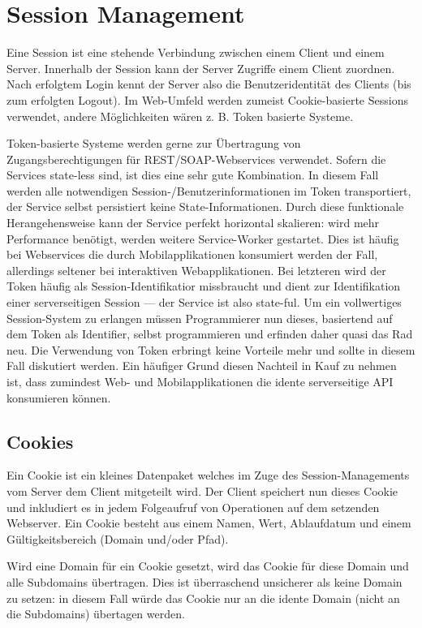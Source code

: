\chapter{Session Management}

Eine Session ist eine stehende Verbindung zwischen einem Client und einem Server. Innerhalb der Session kann der Server Zugriffe einem Client zuordnen. Nach erfolgtem Login kennt der Server also die Benutzeridentität des Clients (bis zum erfolgten Logout). Im Web-Umfeld werden zumeist Cookie-basierte Sessions verwendet, andere Möglichkeiten wären z. B. Token basierte Systeme.

Token-basierte Systeme werden gerne zur Übertragung von Zugangsberechtigungen für REST/SOAP-Webservices verwendet. Sofern die Services state-less sind, ist dies eine sehr gute Kombination. In diesem Fall werden alle notwendigen Session-/Benutzerinformationen im Token transportiert, der Service selbst persistiert keine State-Informationen. Durch diese funktionale Herangehensweise kann der Service perfekt horizontal skalieren: wird mehr Performance benötigt, werden weitere Service-Worker gestartet. Dies ist häufig bei Webservices die durch Mobilapplikationen konsumiert werden der Fall, allerdings seltener bei interaktiven Webapplikationen. Bei letzteren wird der Token häufig als Session-Identifikatior missbraucht und dient zur Identifikation einer serverseitigen Session --- der Service ist also state-ful. Um ein vollwertiges Session-System zu erlangen müssen Programmierer nun dieses, basiertend auf dem Token als Identifier, selbst programmieren und erfinden daher quasi das Rad neu. Die Verwendung von Token erbringt keine Vorteile mehr und sollte in diesem Fall diskutiert werden. Ein häufiger Grund diesen Nachteil in Kauf zu nehmen ist, dass zumindest Web- und Mobilapplikationen die idente serverseitige API konsumieren können.

\section{Cookies}

Ein Cookie ist ein kleines Datenpaket welches im Zuge des Session-Managements vom Server dem Client mitgeteilt wird. Der Client speichert nun dieses Cookie und inkludiert es in jedem Folgeaufruf von Operationen auf dem setzenden Webserver. Ein Cookie besteht aus einem Namen, Wert, Ablaufdatum und einem Gültigkeitsbereich (Domain und/oder Pfad).

Wird eine Domain für ein Cookie gesetzt, wird das Cookie für diese Domain und alle Subdomains übertragen. Dies ist überraschend unsicherer als keine Domain zu setzen: in diesem Fall würde das Cookie nur an die idente Domain (nicht an die Subdomains) übertagen werden.

